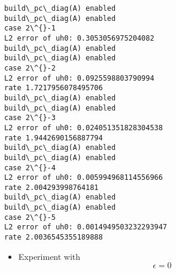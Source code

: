 \documentclass[11pt]{article}
\providecommand{\tightlist}{%
      \setlength{\itemsep}{0pt}\setlength{\parskip}{0pt}}
\begin{document}
    \begin{Verbatim}[commandchars=\\\{\}]
build\_pc\_diag(A) enabled
build\_pc\_diag(A) enabled
case 2\^{}-1
L2 error of uh0: 0.3053056975204082
build\_pc\_diag(A) enabled
build\_pc\_diag(A) enabled
case 2\^{}-2
L2 error of uh0: 0.0925598803790994
rate 1.7217956078495706
build\_pc\_diag(A) enabled
build\_pc\_diag(A) enabled
case 2\^{}-3
L2 error of uh0: 0.024051351828304538
rate 1.9442690156887794
build\_pc\_diag(A) enabled
build\_pc\_diag(A) enabled
case 2\^{}-4
L2 error of uh0: 0.005994968114556966
rate 2.004293998764181
build\_pc\_diag(A) enabled
build\_pc\_diag(A) enabled
case 2\^{}-5
L2 error of uh0: 0.0014949503232293947
rate 2.0036545355189888
    \end{Verbatim}

    \begin{itemize}
\tightlist
\item
  Experiment with \[\epsilon = 0\]
\end{itemize}
\end{document}
